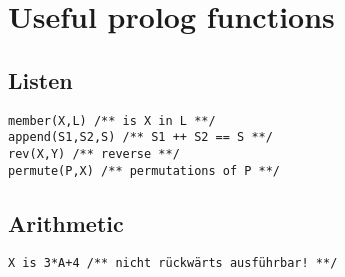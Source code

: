 \appendix\section{Useful prolog functions}
\subsection{Listen}
\begin{verbatim}
member(X,L) /** is X in L **/
append(S1,S2,S) /** S1 ++ S2 == S **/
rev(X,Y) /** reverse **/
permute(P,X) /** permutations of P **/
\end{verbatim}
\subsection{Arithmetic}
\begin{verbatim}
X is 3*A+4 /** nicht rückwärts ausführbar! **/
\end{verbatim}